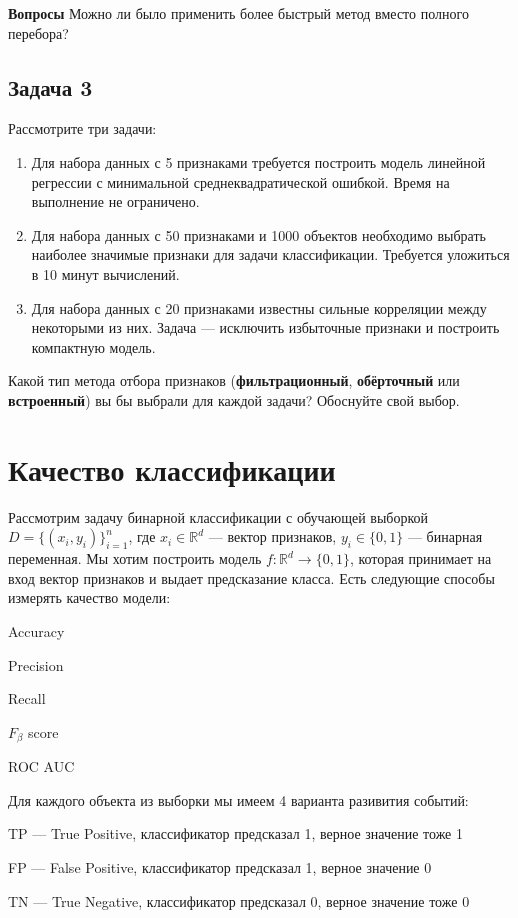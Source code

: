 \textbf{Вопросы}
 Можно ли было применить более быстрый метод вместо полного перебора?

\subsection*{Задача 3}

Рассмотрите три задачи:  
\begin{enumerate}
    \item Для набора данных с 5 признаками требуется построить модель линейной регрессии с минимальной среднеквадратической ошибкой. Время на выполнение не ограничено.  
    \item Для набора данных с 50 признаками и 1000 объектов необходимо выбрать наиболее значимые признаки для задачи классификации. Требуется уложиться в 10 минут вычислений.  
    \item Для набора данных с 20 признаками известны сильные корреляции между некоторыми из них. Задача — исключить избыточные признаки и построить компактную модель.  
\end{enumerate}

Какой тип метода отбора признаков (\textbf{фильтрационный}, \textbf{обёрточный} или \textbf{встроенный}) вы бы выбрали для каждой задачи? Обоснуйте свой выбор.


\section{Качество классификации}
Рассмотрим задачу бинарной классификации с обучающей выборкой $D = \{(x_i, y_i)\}_{i=1}^n$, где $x_i \in \mathbb{R}^d$ --- вектор признаков, $y_i \in \{0, 1\}$ --- бинарная переменная.
Мы хотим построить модель $f: \mathbb{R}^d \to \{0, 1\}$, которая принимает на вход вектор признаков и выдает предсказание класса.
Есть следующие способы измерять качество модели:

Accuracy

Precision

Recall

$F_{\beta}$ score

ROC AUC

Для каждого объекта из выборки мы имеем 4 варианта разивития событий:

TP --- True Positive, классификатор предсказал 1, верное значение тоже 1

FP --- False Positive, классификатор предсказал 1, верное значение 0

TN --- True Negative, классификатор предсказал 0, верное значение тоже 0

